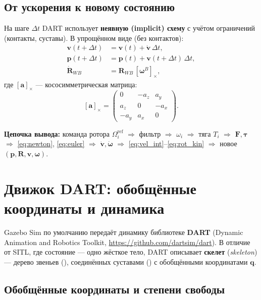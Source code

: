 \documentclass[a4paper,11pt]{article}
\newcommand{\code}[1]{\texttt{\detokenize{#1}}}
\newcommand{\vect}[1]{\bm{#1}}
\newcommand{\mat}[1]{\bm{#1}}
\begin{document}
\subsection{От ускорения к новому состоянию}

На шаге $\Delta t$ DART использует \textbf{неявную (implicit) схему}
с учётом ограничений (контакты, суставы). В упрощённом виде (без контактов):
\begin{align}
  \vect{v}(t+\Delta t) &= \vect{v}(t) + \dot{\vect{v}}\,\Delta t,
  \label{eq:vel_int}\\
  \vect{p}(t+\Delta t) &= \vect{p}(t) + \vect{v}(t+\Delta t)\,\Delta t,
  \label{eq:pos_int}\\
  \dot{\mat{R}}_{WB} &= \mat{R}_{WB}\,[\vect{\omega}^B]_\times,
  \label{eq:rot_kin}
\end{align}
где $[\vect{a}]_\times$ --- кососимметрическая матрица:
\[
  [\vect{a}]_\times =
  \begin{pmatrix}
    0 & -a_z & a_y \\
    a_z & 0 & -a_x \\
    -a_y & a_x & 0
  \end{pmatrix}.
\]

\textbf{Цепочка вывода:}
команда ротора $\Omega_i^{\mathrm{ref}}$
$\Rightarrow$ фильтр $\Rightarrow$ $\omega_i$
$\Rightarrow$ тяга $T_i$
$\Rightarrow$ $\vect{F}, \vect{\tau}$
$\Rightarrow$ \eqref{eq:newton}, \eqref{eq:euler}
$\Rightarrow$ $\dot{\vect{v}}, \dot{\vect{\omega}}$
$\Rightarrow$ \eqref{eq:vel_int}--\eqref{eq:rot_kin}
$\Rightarrow$ новое $(\vect{p}, \mat{R}, \vect{v}, \vect{\omega})$.

\section{Движок DART: обобщённые координаты и динамика}

Gazebo Sim по умолчанию передаёт динамику библиотеке \textbf{DART}
(Dynamic Animation and Robotics Toolkit, \url{https://github.com/dartsim/dart}).
В отличие от SITL, где состояние --- одно жёсткое тело, DART описывает
\textbf{скелет} (\emph{skeleton}) --- дерево звеньев (\code{BodyNode}),
соединённых суставами (\code{Joint}) с обобщёнными координатами $\vect{q}$.

\subsection{Обобщённые координаты и степени свободы}
\end{document}
